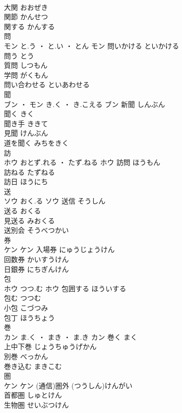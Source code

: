 \documentclass[8pt]{extreport}
\begin{document}
\begin{CJK}{UTF8}{min}
\\	大関	おおぜき	
\\	関節	かんせつ	
\\	関する	かんする	
\\	問	
\\	モン	と.う ・ と.い ・ とん	モン	問いかける	といかける	
\\	問う	とう	
\\	質問	しつもん	
\\	学問	がくもん	
\\	問い合わせる	といあわせる	
\\	聞	
\\	ブン ・ モン	き.く ・ き.こえる	ブン	新聞	しんぶん	
\\	聞く	きく	
\\	聞き手	ききて	
\\	見聞	けんぶん	
\\	道を聞く	みちをきく	
\\	訪	
\\	ホウ	おとず.れる ・ たず.ねる	ホウ	訪問	ほうもん	
\\	訪ねる	たずねる	
\\	訪日	ほうにち	
\\	送	
\\	ソウ	おく.る	ソウ	送信	そうしん	
\\	送る	おくる	
\\	見送る	みおくる	
\\	送別会	そうべつかい	
\\	券	
\\	ケン		ケン	入場券	にゅうじょうけん	
\\	回数券	かいすうけん	
\\	日銀券	にちぎんけん	
\\	包	
\\	ホウ	つつ.む	ホウ	包囲する	ほういする	
\\	包む	つつむ	
\\	小包	こづつみ	
\\	包丁	ほうちょう	
\\	巻	
\\	カン	ま.く ・ まき ・ ま.き	カン	巻く	まく	
\\	上中下巻	じょうちゅうげかん	
\\	別巻	べっかん	
\\	巻き込む	まきこむ	
\\	圏	
\\	ケン		ケン	(通信)圏外	(つうしん)けんがい	
\\	首都圏	しゅとけん	
\\	生物圏	せいぶつけん	

\end{CJK}
\end{document}
